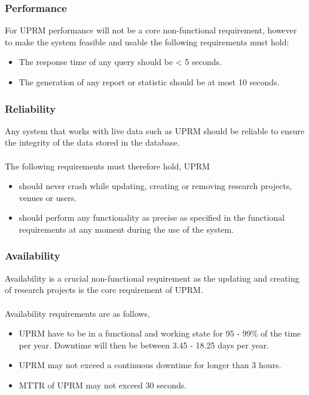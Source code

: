 
\subsubsection{Performance}
For UPRM performance will not be a core non-functional requirement, however to make the system feasible and usable the following requirements must hold:

\begin{itemize}
	\item The response time of any query should be \textless{}  5 seconds.
	\item The generation of any report or statistic should be at most 10 seconds.
\end{itemize}

\subsubsection{Reliability}
Any system that works with live data such as UPRM should be reliable to ensure the integrity of the data stored in the database.\\ \\
The following requirements must therefore hold, UPRM 
\begin{itemize}
	\item should never crash while updating, creating or removing research projects, venues or users.
	\item should perform any functionality as precise as specified in the functional requirements at any moment during the use of the system.
\end{itemize}

\subsubsection{Availability}
Availability is a crucial non-functional requirement as the updating and creating of research projects is the core requirement of UPRM.\\ \\
Availability requirements are as follows,
\begin{itemize}
	\item UPRM have to be in a functional and working state for 95 - 99\% of the time per year. Downtime will then be between 3.45 - 18.25 days per year.
	\item UPRM may not exceed a continuous downtime for longer than 3 hours.
	\item MTTR of UPRM may not exceed 30 seconds.
\end{itemize}

